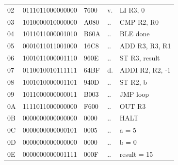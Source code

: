 \begin{tcolorbox}[stepbox, title={Instruction 24 \hfill ticks 70 to 72 \quad JMP loop}]
{\begin{tabular}{@{}lllll@{}}
02 & 0111011000000000 & 7600 & v. & LI R3, 0\\
\rowcolor{pcc}03 & 1010000010000000 & A080 & .. & CMP R2, R0\\
04 & 1011011000001010 & B60A & .. & BLE done\\
05 & 0001011011001000 & 16C8 & .. & ADD R3, R3, R1\\
06 & 1001011000001110 & 960E & .. & ST R3, result\\
07 & 0110010010111111 & 64BF & d. & ADDI R2, R2, -1\\
08 & 1001010000001101 & 940D & .. & ST R2, b\\
09 & 1011000000000011 & B003 & .. & JMP loop\\
0A & 1111011000000000 & F600 & .. & OUT R3\\
0B & 0000000000000000 & 0000 & .. & HALT\\
\rowcolor{datac}0C & 0000000000000101 & 0005 & .. & a = 5\\
\rowcolor{datac}0D & 0000000000000000 & 0000 & .. & b = 0\\
\rowcolor{datac}0E & 0000000000001111 & 000F & .. & result = 15\\
\end{tabular}}
\end{tcolorbox}\par\vspace{3pt}
